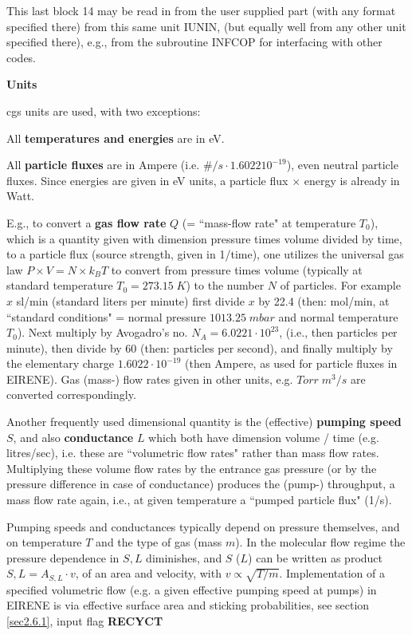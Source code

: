 This last block 14 may be read in from
the user supplied part (with any
format specified there) from this same unit IUNIN, (but equally well from
any other unit specified there), e.g., from the subroutine
INFCOP for interfacing with other codes.


\medskip

\medskip
{\bf Units}

cgs units are used, with two exceptions:
\medskip

All \textbf{temperatures and energies} are in eV.

All \textbf{particle fluxes} are in Ampere (i.e. $\#/s \cdot 1.6022
10^{-19}$), even neutral particle fluxes. Since energies are given in eV units, a particle flux $\times$ energy is already in Watt.


E.g., to convert a \textbf{gas flow rate} $Q$ (= ``mass-flow rate" at temperature $T_0$), which is a quantity given with dimension
pressure times volume divided by time, to a particle flux (source strength, given in 1/\;time), one utilizes
the universal gas law $P \times V = N \times k_B T$ to convert from pressure times volume (typically at standard temperature $T_0= 273.15\; K$)
to the number $N$ of particles.
For example  $x$ sl/min (standard liters per
minute) first divide $x$ by 22.4 (then: mol/min, at ``standard conditions" = normal pressure $1013.25\; mbar$ and normal temperature $T_0$). Next multiply by
Avogadro's no. $N_A = 6.0221 \cdot 10^{23}$, (i.e., then particles per
minute), then divide by $60$ (then: particles per second), and
finally multiply by the elementary charge $1.6022 \cdot 10^{-19}$ (then
Ampere, as used for particle fluxes in EIRENE).
Gas (mass-) flow rates given in other units, e.g. $Torr\; m^3/s$ are converted correspondingly.

Another frequently used dimensional quantity is the (effective) \textbf{pumping speed} $S$, and also \textbf{conductance} $L$ which both have
dimension volume / time (e.g. litres/sec), i.e. these are ``volumetric flow rates" rather than mass flow rates. Multiplying these volume flow rates
by the entrance gas pressure
(or by the pressure difference in case of conductance) produces the (pump-) throughput, a mass flow rate again, i.e., at given temperature a ``pumped particle flux" (1/s).

Pumping speeds and conductances typically depend on pressure themselves, and on temperature $T$ and the type of gas (mass $m$). In the molecular flow regime
the pressure dependence in $S, L$ diminishes, and $S$ ($L$) can be written as product $S,L =A_{S,L} \cdot v$,
of an area and velocity,
with $v \propto \sqrt{T/m}.$
Implementation of a specified volumetric flow (e.g. a given effective pumping speed at pumps) in EIRENE is via effective surface area and  sticking probabilities, see section \ref{sec2.6.1},
input flag \textbf{RECYCT}



